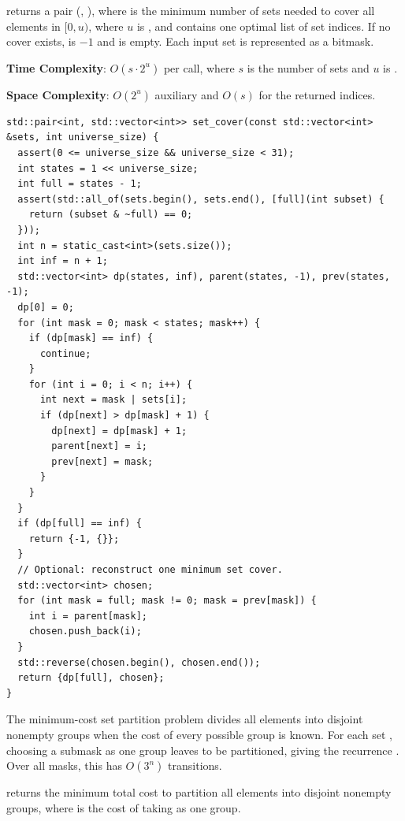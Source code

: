 \begin{compactitem}
  \item {} returns a pair (, ), where  is the minimum number of sets needed to cover all elements in $[0, u)$, where $u$ is , and  contains one optimal list of set indices. If no cover exists,  is $-1$ and  is empty. Each input set is represented as a bitmask.
\end{compactitem}

\textbf{Time Complexity}: $O(s \cdot 2^{u})$ per call, where $s$ is the number of sets and $u$ is .

\textbf{Space Complexity}: $O(2^{u})$ auxiliary and $O(s)$ for the returned indices.

\begin{lstlisting}[style=cpp]
std::pair<int, std::vector<int>> set_cover(const std::vector<int> &sets, int universe_size) {
  assert(0 <= universe_size && universe_size < 31);
  int states = 1 << universe_size;
  int full = states - 1;
  assert(std::all_of(sets.begin(), sets.end(), [full](int subset) {
    return (subset & ~full) == 0;
  }));
  int n = static_cast<int>(sets.size());
  int inf = n + 1;
  std::vector<int> dp(states, inf), parent(states, -1), prev(states, -1);
  dp[0] = 0;
  for (int mask = 0; mask < states; mask++) {
    if (dp[mask] == inf) {
      continue;
    }
    for (int i = 0; i < n; i++) {
      int next = mask | sets[i];
      if (dp[next] > dp[mask] + 1) {
        dp[next] = dp[mask] + 1;
        parent[next] = i;
        prev[next] = mask;
      }
    }
  }
  if (dp[full] == inf) {
    return {-1, {}};
  }
  // Optional: reconstruct one minimum set cover.
  std::vector<int> chosen;
  for (int mask = full; mask != 0; mask = prev[mask]) {
    int i = parent[mask];
    chosen.push_back(i);
  }
  std::reverse(chosen.begin(), chosen.end());
  return {dp[full], chosen};
}
\end{lstlisting}
The minimum-cost set partition problem divides all elements into disjoint nonempty groups when the cost of every possible group is known. For each set , choosing a submask as one group leaves  to be partitioned, giving the recurrence . Over all masks, this has $O(3^{n})$ transitions.

\begin{compactitem}
  \item {} returns the minimum total cost to partition all elements into disjoint nonempty groups, where  is the cost of taking  as one group.
\end{compactitem}

